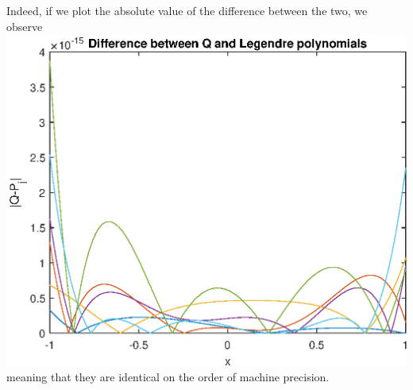 \documentclass{article}
\begin{document}
Indeed, if we plot the absolute value of the difference between the two, we observe\\
\includegraphics[scale=0.6]{17_3.eps}\\
meaning that they are identical on the order of machine precision. 
\end{document}
